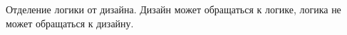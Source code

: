 
\begin{DoxyRefList}
\item[\label{todo__todo000001}%
\Hypertarget{todo__todo000001}%
Структуры данных \hyperlink{class_pasyans_cover_u_w_p_1_1_game_page}{Pasyans\+Cover\+U\+WP.Game\+Page} ]Отделение логики от дизайна. Дизайн может обращаться к логике, логика не может обращаться к дизайну. 
\end{DoxyRefList}